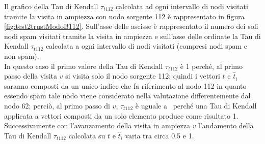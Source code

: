 Il grafico della Tau di Kendall \(\tau_{t112}\)  calcolata  ad ogni intervallo di nodi visitati tramite la visita in ampiezza con nodo sorgente 112 è rappresentato in figura \ref{fig:test2trustModoB112}.  Sull'asse delle ascisse è rappresentato il numero dei soli nodi spam visitati tramite la visita in ampiezza e sull'asse delle ordinate la Tau di Kendall \(\tau_{t112}\) calcolata a ogni intervallo di nodi visitati (compresi nodi spam e non spam).\\
In questo caso il primo valore della Tau di Kendall \(\tau_{t112}\) è 1 perché, al primo passo della visita \(v\) si visita solo il nodo sorgente 112; quindi  i vettori \(t\) e \(\hat{t}_i\) saranno composti da un unico indice che fa riferimento al nodo 112 in quanto essendo spam tale nodo  viene considerato nella valutazione differentemente dal nodo 62; perciò, al primo passo di \(v\), \(\tau_{t112}\) è uguale a \ perché una Tau di Kendall applicata a vettori composti da un solo elemento produce come risultato 1. Successivamente con l'avanzamento della visita in ampiezza \(v\) l'andamento della Tau di Kendall \(\tau_{t112}\) calcolata su \(t\) e \(\hat{t}_i\) varia tra circa 0.5 e 1.

